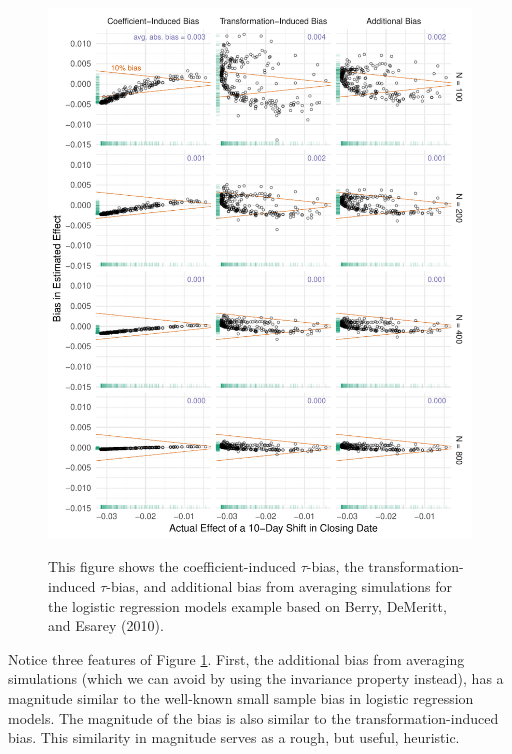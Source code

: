 \documentclass[11pt]{article}
\begin{document}
\begin{figure}[h]
\begin{center}
\includegraphics[scale = 0.75]{figs/nagler-fd-bias.pdf}\\
\vspace{.1in}
\caption{This figure shows the coefficient-induced $\tau$-bias, the transformation-induced $\tau$-bias, and additional bias from averaging simulations for the logistic regression models example based on Berry, DeMeritt, and Esarey (2010).}\label{fig:nagler}
\end{center}
\end{figure}

Notice three features of Figure \ref{fig:nagler}. 
First, the additional bias from averaging simulations (which we can avoid by using the invariance property instead), has a magnitude similar to the well-known small sample bias in logistic regression models. 
The magnitude of the bias is also similar to the transformation-induced bias.
This similarity in magnitude serves as a rough, but useful, heuristic.
\end{document}
